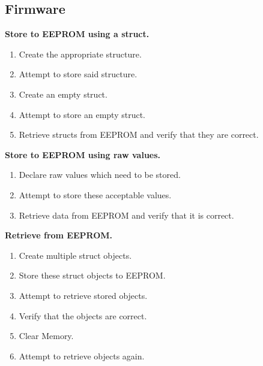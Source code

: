 \documentclass[a4paper,10pt]{article}
\begin{document}
		\subsection{Firmware}
		\textbf{Store to EEPROM using a struct.}
		\begin{enumerate}
			\item Create the appropriate structure.
			\item Attempt to store said structure.
			\item Create an empty struct.
			\item Attempt to store an empty struct.
			\item Retrieve structs from EEPROM and verify that they are correct.
		\end{enumerate}
		\textbf{Store to EEPROM using raw values.}
		\begin{enumerate}
			\item Declare raw values which need to be stored.
			\item Attempt to store these acceptable values.
			\item Retrieve data from EEPROM and verify that it is correct. 
		\end{enumerate}
		\textbf{Retrieve from EEPROM.}
		\begin{enumerate}
			\item Create multiple struct objects.
			\item Store these struct objects to EEPROM.
			\item Attempt to retrieve stored objects.
			\item Verify that the objects are correct.
			\item Clear Memory.
			\item Attempt to retrieve objects again.
		\end{enumerate}
		
\end{document}
